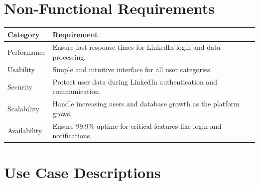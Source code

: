 \documentclass[a4paper,12pt]{article}
\begin{document}
\section{Non-Functional Requirements}
\begin{longtable}{|l|p{12cm}|}
\hline
\textbf{Category} & \textbf{Requirement} \\ \hline
Performance & Ensure fast response times for LinkedIn login and data processing. \\ \hline
Usability &Simple and intuitive interface for all user categories. \\ \hline
Security & Protect user data during LinkedIn authentication and communication. \\ \hline
Scalability & Handle increasing users and database growth as the platform grows. \\ \hline
Availability & Ensure 99.9\% uptime for critical features like login and notifications. \\ \hline
\end{longtable}

\section{Use Case Descriptions}
\end{document}
